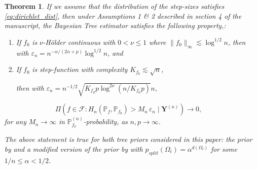 \documentclass[12pt]{article}
\newcommand{\bm}[1]{\boldsymbol{#1}}
\renewcommand{\P}{\mathbb{P}}
\newcommand{\Y}{\bm{Y}}
\newcommand{\1}{\mathbb{I}}
\def\Y{\bm{Y}}
\renewcommand{\P}{\mathbb{P}}
\renewcommand{\Y}{\bm{Y}}
\theoremstyle{plain}
\newtheorem{theorem}{Theorem}[section]
\theoremstyle{definition}
\theoremstyle{remark}
\begin{document}
\begin{theorem}\label{thm:dirichlet_tree}
 If we assume that the distribution of the step-sizes satisfies \eqref{eq:dirichlet_dist}, then under Assumptions 1 \& 2 described in section 4 of the manuscript, the Bayesian Tree estimator satisfies the following property,: 
 \begin{enumerate}
 \item[(i)] If $f_0$ is $\nu$-H\"{o}lder continuous with  {$0<\nu\leq 1$} where $\|f_0\|_\infty\lesssim \log^{1/2} n$, then with $\varepsilon_n=n^{-\alpha/(2\alpha+p)}\log^{1/2} n$, and
 \item[(ii)] If $f_0$ is step-function with complexity $K_{f_0} \lesssim \sqrt{n}$, 
 
 then with $\varepsilon_n=n^{-1/2}\sqrt{K_{f_0}p \log^{2\nu}{\left(n/K_{f_0}p\right)}} n$, 
 \end{enumerate}
\begin{equation*}
\Pi\left( f \in \mathcal{F}: H_n(\P_f,\P_{f_0}) > M_n\,\varepsilon_n \mid \Y^{(n)}\right) \to 0,
\end{equation*}
for any $M_n \to \infty$  in $\P_{f_0}^{(n)}$-probability, as $n,p \to \infty$. 
 
The above statement is true for both tree priors considered in this paper: the prior by \cite{denison1998bayesian} and a modified version of the prior by \cite{chipman1998bayesian} with $p_{split}(\Omega_t)=\alpha^{d(\Omega_t)}$ for some $1/n\leq \alpha<1/2$.
\end{theorem}
\end{document}
